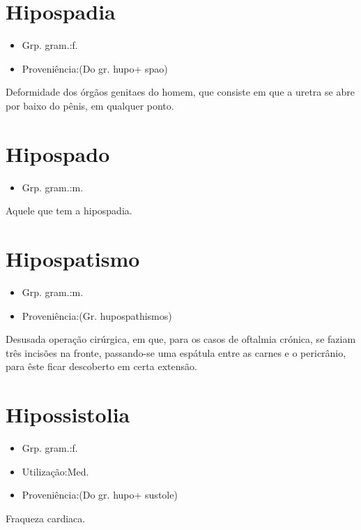 \documentclass{article}
\begin{document}
\section{Hipospadia}
\begin{itemize}
\item {Grp. gram.:f.}
\end{itemize}
\begin{itemize}
\item {Proveniência:(Do gr. \textunderscore hupo\textunderscore  + \textunderscore spao\textunderscore )}
\end{itemize}
Deformidade dos órgãos genitaes do homem, que consiste em que a uretra se abre por baixo do pênis, em qualquer ponto.
\section{Hipospado}
\begin{itemize}
\item {Grp. gram.:m.}
\end{itemize}
Aquele que tem a hipospadia.
\section{Hipospatismo}
\begin{itemize}
\item {Grp. gram.:m.}
\end{itemize}
\begin{itemize}
\item {Proveniência:(Gr. \textunderscore hupospathismos\textunderscore )}
\end{itemize}
Desusada operação cirúrgica, em que, para os casos de oftalmia crónica, se faziam três incisões na fronte, passando-se uma espátula entre as carnes e o pericrânio, para êste ficar descoberto em certa extensão.
\section{Hipossistolia}
\begin{itemize}
\item {Grp. gram.:f.}
\end{itemize}
\begin{itemize}
\item {Utilização:Med.}
\end{itemize}
\begin{itemize}
\item {Proveniência:(Do gr. \textunderscore hupo\textunderscore  + \textunderscore sustole\textunderscore )}
\end{itemize}
Fraqueza cardiaca.
\end{document}
